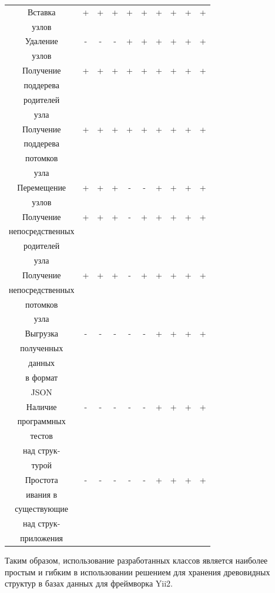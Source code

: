 \documentclass[a4paper,14pt]{extreport}
\theoremstyle{definition}
\begin{document}
\begin{longtable}{|c|c|c|c|c|c|c|c|c|c|}
\hline
Вставка &+&+&+&+&+&+&+&+&+ \\
узлов&&&&&&&&& \\
\hline
Удаление&-&-&-&+&+&+&+&+&+ \\
узлов&&&&&&&&& \\
\hline
Получение&+&+&+&+&+&+&+&+&+ \\
поддерева&&&&&&&&& \\
родителей&&&&&&&&& \\
узла&&&&&&&&& \\
\hline
Получение&+&+&+&+&+&+&+&+&+ \\
поддерева&&&&&&&&& \\
потомков&&&&&&&&& \\
узла&&&&&&&&& \\
\hline
Перемещение&+&+&+&-&-&+&+&+&+ \\
узлов&&&&&&&&& \\
\hline
Получение&+&+&+&-&+&+&+&+&+ \\
непосредственных&&&&&&&&& \\
родителей&&&&&&&&& \\
узла&&&&&&&&& \\
\hline
Получение&+&+&+&-&+&+&+&+&+ \\
непосредственных&&&&&&&&& \\
потомков&&&&&&&&& \\
узла&&&&&&&&& \\
\hline
Выгрузка&-&-&-&-&-&+&+&+&+ \\
полученных&&&&&&&&& \\
данных&&&&&&&&& \\
в формат&&&&&&&&& \\
JSON&&&&&&&&& \\
\hline
Наличие&-&-&-&-&-&+&+&+&+ \\
программных&&&&&&&&& \\
тестов&&&&&&&&& \\
над струк-&&&&&&&&& \\
турой&&&&&&&&& \\
\hline
Простота&-&-&-&-&-&+&+&+&+ \\
ивания в&&&&&&&&& \\
существующие&&&&&&&&& \\
над струк-&&&&&&&&& \\
приложения&&&&&&&&& \\
\hline

\end{longtable}
Таким образом, использование разработанных классов является наиболее простым и гибким в использовании решением для хранения древовидных структур в базах данных для фреймворка Yii2.
\end{document}
